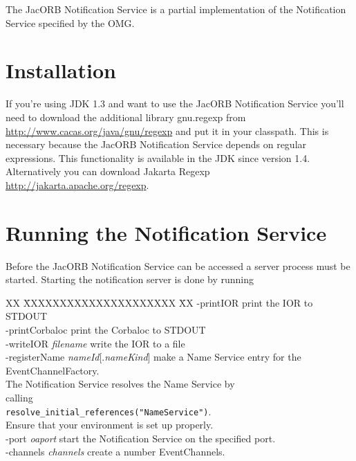 %
%

The JacORB Notification Service is a partial implementation of
the Notification Service specified by the OMG.

\section{Installation}
\label{sec:installation}

If you're using JDK 1.3 and want to use the JacORB Notification
Service you'll need 
to download the additional library gnu.regexp from 
\href{http://www.cacas.org/java/gnu/regexp}{http://www.cacas.org/java/gnu/regexp}
and put it in your classpath. This is necessary because the JacORB
Notification Service depends on regular expressions. This
functionality is available in the JDK since version 1.4. Alternatively
you can download Jakarta Regexp \href{http://jakarta.apache.org/regexp}{http://jakarta.apache.org/regexp}.

\section{Running the Notification Service}
\label{sec:ntfy-running}

Before the JacORB Notification Service can be accessed a server
process must be started. Starting
the notification server is done by running



\begin{tabbing}
XX \= XXXXXXXXXXXXXXXXXXXXX \= XX \kill
\> -printIOR \> print the IOR to STDOUT \\
\> -printCorbaloc \> print the Corbaloc to STDOUT \\
\> -writeIOR \emph{filename} \> write the IOR to a file \\
\> -registerName \emph{nameId}[.\emph{nameKind}] \> make a Name Service entry
for the EventChannelFactory. \\
\> \> The Notification Service resolves the Name Service by \\
\> \> calling \\
\> \> \texttt{resolve\_initial\_references("NameService")}. \\
\> \> Ensure that your environment is set up properly. \\
\> -port \emph{oaport} \> start the Notification Service on the specified
port. \\
\> -channels \emph{channels} \> create a number EventChannels. \\
\end{tabbing}

